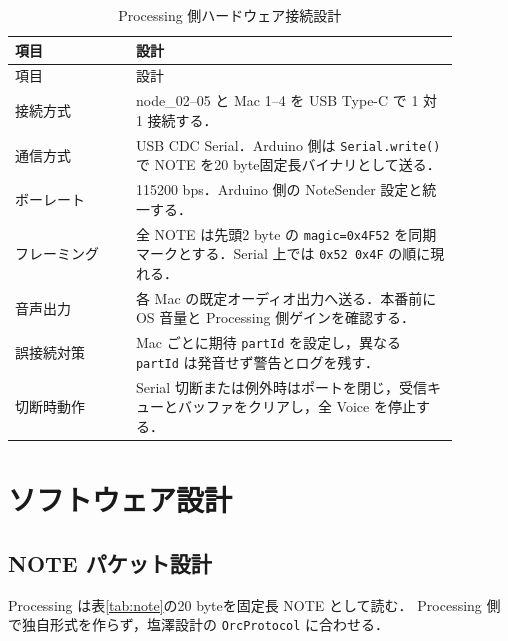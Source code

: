 \documentclass[lualatex,book,openany,paper=a4paper,jafontsize=11.5pt,jafontscale=1.05]{jlreq}
\begin{document}
\begin{longtable}{p{0.24\linewidth}p{0.64\linewidth}}
\caption{Processing 側ハードウェア接続設計}\label{tab:hw-design}\\
\toprule
項目 & 設計 \\
\midrule
\endfirsthead
\toprule
項目 & 設計 \\
\midrule
\endhead
接続方式 & node\_02--05 と Mac 1--4 を USB Type-C で 1 対 1 接続する． \\
通信方式 & USB CDC Serial．Arduino 側は \texttt{Serial.write()} で NOTE を20 byte固定長バイナリとして送る． \\
ボーレート & 115200 bps．Arduino 側の NoteSender 設定と統一する． \\
フレーミング & 全 NOTE は先頭2 byte の \texttt{magic=0x4F52} を同期マークとする．Serial 上では \texttt{0x52 0x4F} の順に現れる． \\
音声出力 & 各 Mac の既定オーディオ出力へ送る．本番前に OS 音量と Processing 側ゲインを確認する． \\
誤接続対策 & Mac ごとに期待 \texttt{partId} を設定し，異なる \texttt{partId} は発音せず警告とログを残す． \\
切断時動作 & Serial 切断または例外時はポートを閉じ，受信キューとバッファをクリアし，全 Voice を停止する． \\
\bottomrule
\end{longtable}

\section{ソフトウェア設計}


\subsection{NOTE パケット設計}
Processing は表\ref{tab:note}の20 byteを固定長 NOTE として読む．
Processing 側で独自形式を作らず，塩澤設計の \texttt{OrcProtocol} に合わせる．
\end{document}
